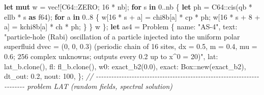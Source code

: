 \documentclass[
  10pt,
]{article}
\newenvironment{Shaded}{}{}
\newcommand{\CommentTok}[1]{\textcolor[rgb]{0.38,0.63,0.69}{\textit{#1}}}
\newcommand{\ControlFlowTok}[1]{\textcolor[rgb]{0.00,0.44,0.13}{\textbf{#1}}}
\newcommand{\DataTypeTok}[1]{\textcolor[rgb]{0.56,0.13,0.00}{#1}}
\newcommand{\DecValTok}[1]{\textcolor[rgb]{0.25,0.63,0.44}{#1}}
\newcommand{\KeywordTok}[1]{\textcolor[rgb]{0.00,0.44,0.13}{\textbf{#1}}}
\newcommand{\NormalTok}[1]{#1}
\newcommand{\OperatorTok}[1]{\textcolor[rgb]{0.40,0.40,0.40}{#1}}
\newcommand{\PreprocessorTok}[1]{\textcolor[rgb]{0.74,0.48,0.00}{#1}}
\newcommand{\StringTok}[1]{\textcolor[rgb]{0.25,0.44,0.63}{#1}}
\begin{document}
\begin{Shaded}
\begin{Highlighting}[]
        \KeywordTok{let} \KeywordTok{mut}\NormalTok{ w }\OperatorTok{=} \PreprocessorTok{vec!}\NormalTok{[}\PreprocessorTok{C64::}\NormalTok{ZERO}\OperatorTok{;} \DecValTok{16} \OperatorTok{*}\NormalTok{ nb]}\OperatorTok{;}
        \ControlFlowTok{for}\NormalTok{ s }\KeywordTok{in} \DecValTok{0}\OperatorTok{..}\NormalTok{nb }\OperatorTok{\{}
            \KeywordTok{let}\NormalTok{ ph }\OperatorTok{=} \PreprocessorTok{C64::}\NormalTok{cis(qb }\OperatorTok{*}\NormalTok{ ellb }\OperatorTok{*}\NormalTok{ s }\KeywordTok{as} \DataTypeTok{f64}\NormalTok{)}\OperatorTok{;}
            \ControlFlowTok{for}\NormalTok{ a }\KeywordTok{in} \DecValTok{0}\OperatorTok{..}\DecValTok{8} \OperatorTok{\{}
\NormalTok{                w[}\DecValTok{16} \OperatorTok{*}\NormalTok{ s }\OperatorTok{+}\NormalTok{ a] }\OperatorTok{=}\NormalTok{ chi8b[a] }\OperatorTok{*}\NormalTok{ cp }\OperatorTok{*}\NormalTok{ ph}\OperatorTok{;}
\NormalTok{                w[}\DecValTok{16} \OperatorTok{*}\NormalTok{ s }\OperatorTok{+} \DecValTok{8} \OperatorTok{+}\NormalTok{ a] }\OperatorTok{=}\NormalTok{ kchi8b[a] }\OperatorTok{*}\NormalTok{ ch }\OperatorTok{*}\NormalTok{ ph}\OperatorTok{;}
            \OperatorTok{\}}
        \OperatorTok{\}}
\NormalTok{        w}
    \OperatorTok{\};}
    \KeywordTok{let}\NormalTok{ as4 }\OperatorTok{=}\NormalTok{ Problem }\OperatorTok{\{}
\NormalTok{        name}\OperatorTok{:} \StringTok{"AS{-}4"}\OperatorTok{,}
\NormalTok{        text}\OperatorTok{:} \StringTok{"particle{-}hole (Rabi) oscillation of a particle injected into the uniform polar superfluid dvec = (0, 0, 0.3) (periodic chain of 16 sites, dx = 0.5, m = 0.4, mu = 0.6; 256 complex unknowns; outputs every 0.2 up to x\^{}0 = 20)"}\OperatorTok{,}
\NormalTok{        lat}\OperatorTok{:}\NormalTok{ lat\_b}\OperatorTok{.}\NormalTok{clone()}\OperatorTok{,}
\NormalTok{        fl}\OperatorTok{:}\NormalTok{ fl\_b}\OperatorTok{.}\NormalTok{clone()}\OperatorTok{,}
\NormalTok{        w0}\OperatorTok{:}\NormalTok{ exact\_b2(}\DecValTok{0.0}\NormalTok{)}\OperatorTok{,}
\NormalTok{        exact}\OperatorTok{:} \DataTypeTok{Box}\PreprocessorTok{::}\NormalTok{new(exact\_b2)}\OperatorTok{,}
\NormalTok{        dt\_out}\OperatorTok{:} \DecValTok{0.2}\OperatorTok{,}
\NormalTok{        nout}\OperatorTok{:} \DecValTok{100}\OperatorTok{,}
    \OperatorTok{\};}
    \CommentTok{// {-}{-}{-}{-}{-}{-}{-}{-}{-}{-}{-}{-}{-}{-}{-}{-}{-}{-}{-}{-}{-}{-}{-}{-}{-}{-}{-}{-}{-}{-}{-}{-}{-}{-}{-}{-}{-}{-}{-}{-}{-}{-}{-}{-}{-}{-}{-}{-}{-}{-}{-}{-}{-}{-}{-}{-}{-}{-}{-}{-}{-}{-}{-}{-}{-}{-}{-}{-}{-}{-}{-}{-} problem LAT (random fields, spectral solution)}

\end{Highlighting}
\end{Shaded}
\end{document}
